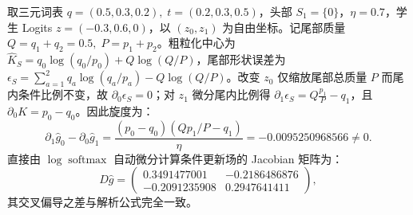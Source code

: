 \documentclass[lang=cn,scheme=chinese,openany]{elegantbook}
\begin{document}
\begin{example}
\label{opd:curl-example}
取三元词表 $q=(0.5,0.3,0.2),\; t=(0.2,0.3,0.5)$，头部 $S_1=\{0\}$，$\eta=0.7$，学生 Logits $z=(-0.3,0.6,0)$，以 $(z_0,z_1)$ 为自由坐标。记尾部质量 $Q=q_1+q_2=0.5,\; P=p_1+p_2$。粗粒化中心为 $\widehat K_S=q_0\log(q_0/p_0)+Q\log(Q/P)$，尾部形状误差为 $\epsilon_S=\sum_{a=1}^2 q_a\log(q_a/p_a)-Q\log(Q/P)$。改变 $z_0$ 仅缩放尾部总质量 $P$ 而尾内条件比例不变，故 $\partial_0\epsilon_S=0$；对 $z_1$ 微分尾内比例得 $\partial_1\epsilon_S=Q\frac{p_1}{P}-q_1$，且 $\partial_0 K=p_0-q_0$。因此旋度为：
\begin{equation}
\partial_1\widehat g_0-\partial_0\widehat g_1
=\frac{(p_0-q_0)(Q p_1/P-q_1)}{\eta}
=-0.0095250968566\ne 0.
\end{equation}
直接由 $\log\operatorname{softmax}$ 自动微分计算条件更新场的 Jacobian 矩阵为：
\begin{equation}
D\widehat g=
\begin{pmatrix}
0.3491477001&-0.2186486876\\
-0.2091235908&0.2947641411
\end{pmatrix},
\end{equation}
其交叉偏导之差与解析公式完全一致。
\end{example}
\end{document}
